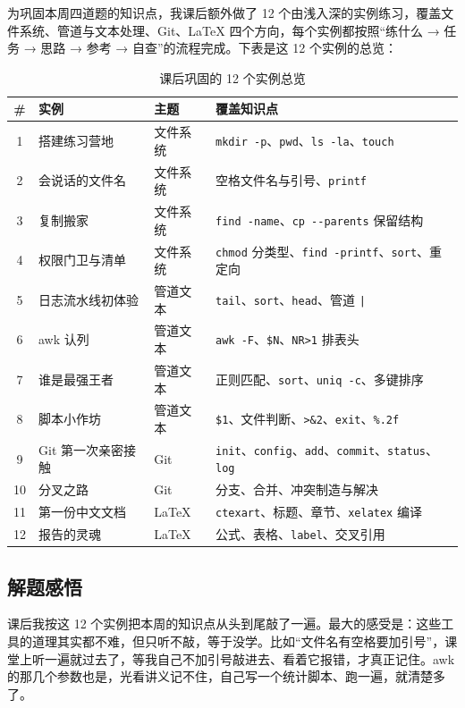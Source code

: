 \documentclass[a4paper, 12pt]{article}
\begin{document}
为巩固本周四道题的知识点，我课后额外做了 12 个由浅入深的实例练习，覆盖文件系统、管道与文本处理、Git、\LaTeX{} 四个方向，每个实例都按照“练什么 → 任务 → 思路 → 参考 → 自查”的流程完成。下表是这 12 个实例的总览：

\begin{table}[h]
  \centering
  \small
  \begin{tabular}{cllp{7.0cm}}
    \toprule
    \textbf{\#} & \textbf{实例} & \textbf{主题} & \textbf{覆盖知识点} \\
    \midrule
    1 & 搭建练习营地 & 文件系统 & \texttt{mkdir -p}、\texttt{pwd}、\texttt{ls -la}、\texttt{touch} \\
    2 & 会说话的文件名 & 文件系统 & 空格文件名与引号、\texttt{printf} \\
    3 & 复制搬家 & 文件系统 & \texttt{find -name}、\texttt{cp -{}-parents} 保留结构 \\
    4 & 权限门卫与清单 & 文件系统 & \texttt{chmod} 分类型、\texttt{find -printf}、\texttt{sort}、重定向 \\
    5 & 日志流水线初体验 & 管道文本 & \texttt{tail}、\texttt{sort}、\texttt{head}、管道 \texttt{|} \\
    6 & awk 认列 & 管道文本 & \texttt{awk -F}、\texttt{\$N}、\texttt{NR>1} 排表头 \\
    7 & 谁是最强王者 & 管道文本 & 正则匹配、\texttt{sort}、\texttt{uniq -c}、多键排序 \\
    8 & 脚本小作坊 & 管道文本 & \texttt{\$1}、文件判断、\texttt{>\&2}、\texttt{exit}、\texttt{\%.2f} \\
    9 & Git 第一次亲密接触 & Git & \texttt{init}、\texttt{config}、\texttt{add}、\texttt{commit}、\texttt{status}、\texttt{log} \\
    10 & 分叉之路 & Git & 分支、合并、冲突制造与解决 \\
    11 & 第一份中文文档 & \LaTeX{} & \texttt{ctexart}、标题、章节、\texttt{xelatex} 编译 \\
    12 & 报告的灵魂 & \LaTeX{} & 公式、表格、\texttt{label}、交叉引用 \\
    \bottomrule
  \end{tabular}
  \caption{课后巩固的 12 个实例总览}
  \label{tab:practice}
\end{table}

\subsection{解题感悟}

课后我按这 12 个实例把本周的知识点从头到尾敲了一遍。最大的感受是：这些工具的道理其实都不难，但只听不敲，等于没学。比如“文件名有空格要加引号”，课堂上听一遍就过去了，等我自己不加引号敲进去、看着它报错，才真正记住。awk 的那几个参数也是，光看讲义记不住，自己写一个统计脚本、跑一遍，就清楚多了。
\end{document}

